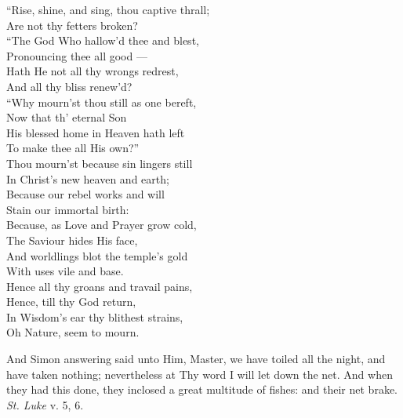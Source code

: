  “Rise, shine, and sing, thou captive thrall; \\
 Are not thy fetters broken? \\
  “The God Who hallow’d thee and blest, \\
 Pronouncing thee all good — \\
 Hath He not all thy wrongs redrest, \\
 And all thy bliss renew’d? \\
  “Why mourn’st thou still as one bereft, \\
 Now that th’ eternal Son \\
 His blessed home in Heaven hath left \\
 To make thee all His own?” \\
  Thou mourn’st because sin lingers still \\
 In Christ’s new heaven and earth; \\
 Because our rebel works and will \\
 Stain our immortal birth: \\
  Because, as Love and Prayer grow cold, \\
 The Saviour hides His face, \\
 And worldlings blot the temple’s gold \\
 With uses vile and base. \\
  Hence all thy groans and travail pains, \\
 Hence, till thy God return, \\
 In Wisdom’s ear thy blithest strains, \\
 Oh Nature, seem to mourn.\\


And Simon answering said unto Him, Master, we have toiled all the night, and have taken nothing; nevertheless at Thy word I will let down the net. And when they had this done, they inclosed a great multitude of fishes: and their net brake. \emph{St. Luke} v. 5, 6.

